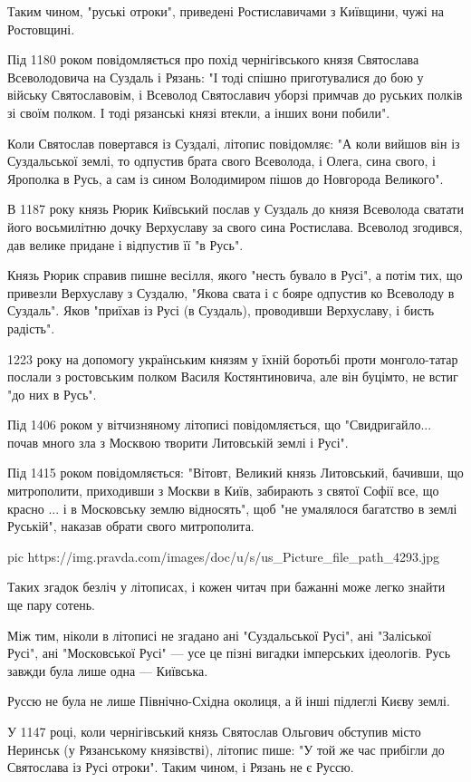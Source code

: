 Таким чином, "руські отроки", приведені Ростиславичами з Київщини, чужі на
Ростовщині.

Під 1180 роком повідомляється про похід чернігівського князя Святослава
Всеволодовича на Суздаль і Рязань: "І тоді спішно приготувалися до бою у
війську Святославовім, і Всеволод Святославич уборзі примчав до руських полків
зі своїм полком. І тоді рязанські князі втекли, а інших вони побили".

Коли Святослав повертався із Суздалі, літопис повідомляє: "А коли вийшов він із
Суздальської землі, то одпустив брата свого Всеволода, і Олега, сина свого, і
Ярополка в Русь, а сам із сином Володимиром пішов до Новгорода Великого".

В 1187 року князь Рюрик Київський послав у Суздаль до князя Всеволода сватати
його восьмилітню дочку Верхуславу за свого сина Ростислава. Всеволод згодився,
дав велике придане і відпустив її "в Русь".

Князь Рюрик справив пишне весілля, якого "несть бувало в Русі", а потім тих, що
привезли Верхуславу з Суздалю, "Якова свата і с бояре одпустив ко Всеволоду в
Суздаль". Яков "приїхав із Русі (в Суздаль), проводивши Верхуславу, і бисть
радість".

1223 року на допомогу українським князям у їхній боротьбі проти монголо-татар
послали з ростовським полком Василя Костянтиновича, але він буцімто, не встиг
"до них в Русь".

Під 1406 роком у вітчизняному літописі повідомляється, що "Свидригайло... почав
много зла з Москвою творити Литовській землі і Русі".

Під 1415 роком повідомляється: "Вітовт, Великий князь Литовський, бачивши, що
митрополити, приходивши з Москви в Київ, забирають з святої Софії все, що
красно ... і в Московську землю відносять", щоб "не умалялося багатство в землі
Руській", наказав обрати свого митрополита.

\ifcmt
pic https://img.pravda.com/images/doc/u/s/us_Picture_file_path_4293.jpg
\fi

Таких згадок безліч у літописах, і кожен читач при бажанні може легко знайти ще
пару сотень.

Між тим, ніколи в літописі не згадано ані "Суздальської Русі", ані "Заліської
Русі", ані "Московської Русі" --- усе це пізні вигадки імперських ідеологів. Русь
завжди була лише одна --- Київська.

Руссю не була не лише Північно-Східна околиця, а й інші підлеглі Києву землі.

У 1147 році, коли чернігівський князь Святослав Ольгович обступив місто
Неринськ (у Рязанському князівстві), літопис пише: "У той же час прибігли до
Святослава із Русі отроки". Таким чином, і Рязань не є Руссю.

